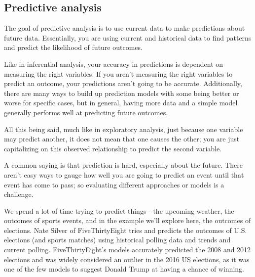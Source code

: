 \documentclass[11pt,fancy]{elegantbook}
\begin{document}
\subsection{Predictive analysis}
The goal of predictive analysis is to use current data to make predictions about future data. Essentially, you are using current and historical data to find patterns and predict the likelihood of future outcomes.
\par Like in inferential analysis, your accuracy in predictions is dependent on measuring the right variables. If you aren't measuring the right variables to predict an outcome, your predictions aren't going to be accurate. Additionally, there are many ways to build up prediction models with some being better or worse for specific cases, but in general, having more data and a simple model generally performs well at predicting future outcomes.
\par All this being said, much like in exploratory analysis, just because one variable may predict another, it does not mean that one causes the other; you are just capitalizing on this observed relationship to predict the second variable.
\par A common saying is that prediction is hard, especially about the future. There aren't easy ways to gauge how well you are going to predict an event until that event has come to pass; so evaluating different approaches or models is a challenge.
\par We spend a lot of time trying to predict things - the upcoming weather, the outcomes of sports events, and in the example we'll explore here, the outcomes of elections. Nate Silver of FiveThirtyEight tries and predicts the outcomes of U.S. elections (and sports matches) using historical polling data and trends and current polling. FiveThirtyEight's models accurately predicted the 2008 and 2012 elections and was widely considered an outlier in the 2016 US elections, as it was one of the few models to suggest Donald Trump at having a chance of winning.
\end{document}
